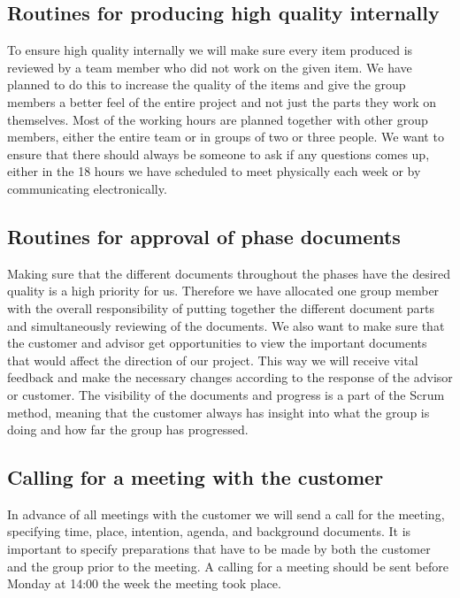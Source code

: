 \newpage

\subsection{Routines for producing high quality internally}
To ensure high quality internally we will make sure every item produced is reviewed by a team member who did not work on the given item. We have planned to do this to increase the quality of the items and give the group members a better feel of the entire project and not just the parts they work on themselves.
\newline
\newline
Most of the working hours are planned together with other group members, either the entire team or in groups of two or three people. We want to ensure that there should always be someone to ask if any questions comes up, either in the 18 hours we have scheduled to meet physically each week or by communicating electronically. 

\subsection{Routines for approval of phase documents}
Making sure that the different documents throughout the phases have the desired quality is a high priority for us. Therefore we have allocated one group member with the overall responsibility of putting together the different document parts and simultaneously reviewing of the documents. 
\newline
\newline 
We also want to make sure that the customer and advisor get opportunities to view the important documents that would affect the direction of our project. This way we will receive vital feedback and make the necessary changes according to the response of the advisor or customer. 
\newline
\newline
The visibility of the documents and progress is a part of the Scrum method, meaning that the customer always has insight into what the group is doing and how far the group has progressed.

\subsection{Calling for a meeting with the customer}
In advance of all meetings with the customer we will send a call for the meeting, specifying time, place, intention, agenda, and background documents. It is important to specify preparations that have to be made by both the customer and the group prior to the meeting.
\newline
\newline
A calling for a meeting should be sent before Monday at 14:00 the week the meeting took place.

